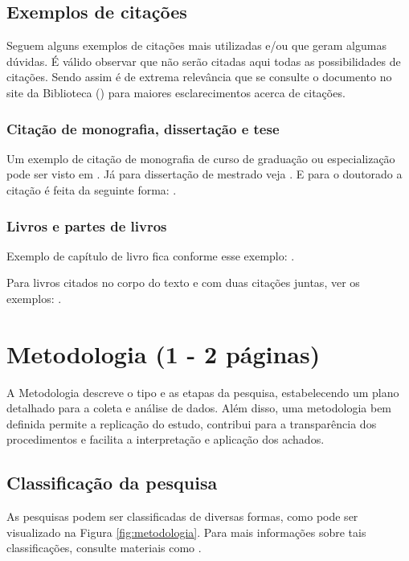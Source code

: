 \subsection{\esp Exemplos de citações} 

Seguem alguns exemplos de citações mais utilizadas e/ou que geram algumas dúvidas. É válido observar que não serão citadas aqui
todas as possibilidades de citações. Sendo assim é de extrema relevância que se consulte o documento no site da Biblioteca () para maiores esclarecimentos acerca de citações.

\subsubsection{\esp Citação de monografia, dissertação e tese}

Um exemplo de citação de monografia de curso de graduação ou especialização pode ser visto em .
Já para dissertação de mestrado veja . E para o doutorado a citação é feita da seguinte forma: . 



\subsubsection{\esp Livros e partes de livros}

Exemplo de capítulo de livro fica conforme esse exemplo: .

Para livros citados no corpo do texto e com duas citações juntas, ver os exemplos: .

\newpage

\section{\esp Metodologia (1 - 2 páginas)}
A Metodologia descreve o tipo e as etapas da pesquisa, estabelecendo um plano detalhado para a coleta e análise de dados. Além disso, uma metodologia bem definida permite a replicação do estudo, contribui para a transparência dos procedimentos e facilita a interpretação e aplicação dos achados.

    \subsection{\esp Classificação da pesquisa}
As pesquisas podem ser classificadas de diversas formas, como pode ser visualizado na Figura \ref{fig:metodologia}. Para mais informações sobre tais classificações, consulte materiais como .

